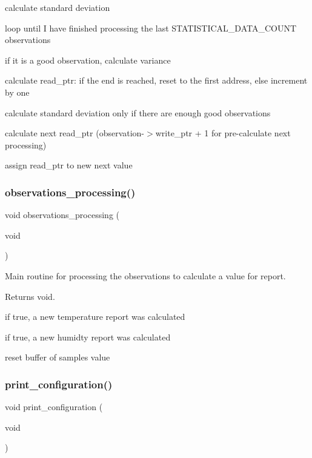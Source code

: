 calculate standard deviation

loop until I have finished processing the last S\+T\+A\+T\+I\+S\+T\+I\+C\+A\+L\+\_\+\+D\+A\+T\+A\+\_\+\+C\+O\+U\+NT observations

if it is a good observation, calculate variance

calculate read\+\_\+ptr\+: if the end is reached, reset to the first address, else increment by one

calculate standard deviation only if there are enough good observations

calculate next read\+\_\+ptr (observation-\/$>$write\+\_\+ptr + 1 for pre-\/calculate next processing)

assign read\+\_\+ptr to new next value \mbox{\label{i2c-th_8ino_a4c8e037e3b3f4c043abf3de8cf57fe68}} 
\subsubsection{\texorpdfstring{observations\+\_\+processing()}{observations\_processing()}}
{\footnotesize\ttfamily void observations\+\_\+processing (\begin{DoxyParamCaption}\item[{void}]{ }\end{DoxyParamCaption})}



Main routine for processing the observations to calculate a value for report. 

\begin{DoxyReturn}{Returns}
void. 
\end{DoxyReturn}
if true, a new temperature report was calculated

if true, a new humidty report was calculated

reset buffer of samples value \mbox{\label{i2c-th_8ino_a65b2dadc0411e43874ec8ed7f73bc62a}} 
\subsubsection{\texorpdfstring{print\+\_\+configuration()}{print\_configuration()}}
{\footnotesize\ttfamily void print\+\_\+configuration (\begin{DoxyParamCaption}\item[{void}]{ }\end{DoxyParamCaption})}




